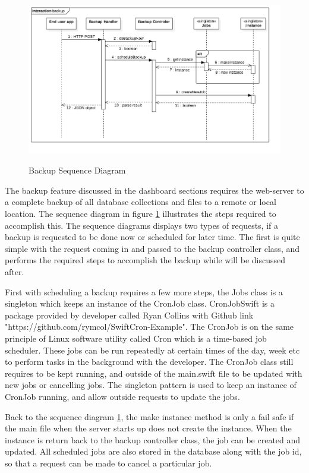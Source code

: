 \begin{figure}[!h]
    \caption{Backup Sequence Diagram}
    \centering
    \includegraphics[width=150mm]{images/sequence/backup}
    \label{fig:backup-s}
\end{figure}

The backup feature discussed in the dashboard sections requires the web-server to a complete backup of all database collections and files to a remote or local location. The sequence diagram in figure \ref{fig:backup-s} illustrates the steps required to accomplish this. The sequence diagrams displays two types of requests, if a backup is requested to be done now or scheduled for later time. The first is quite simple with the request coming in and passed to the backup controller class, and performs the required steps to accomplish the backup while will be discussed after.

First with scheduling a backup requires a few more steps, the Jobs class is a singleton which keeps an instance of the CronJob class. CronJobSwift is a package provided by developer called Ryan Collins with Github link "https://github.com/rymcol/SwiftCron-Example". The CronJob is on the same principle of Linux software utility called Cron which is a time-based job scheduler. These jobs can be run repeatedly at certain times of the day, week etc to perform tasks in the background with the developer. The CronJob class still requires to be kept running, and outside of the main.swift file to be updated with new jobs or cancelling jobs. The singleton pattern is used to keep an instance of CronJob running, and allow outside requests to update the jobs. 

Back to the sequence diagram \ref{fig:backup-s}, the make instance method is only a fail safe if the main file when the server starts up does not create the instance. When the instance is return back to the backup controller class, the job can be created and updated. All scheduled jobs are also stored in the database along with the job id, so that a request can be made to cancel a particular job.

